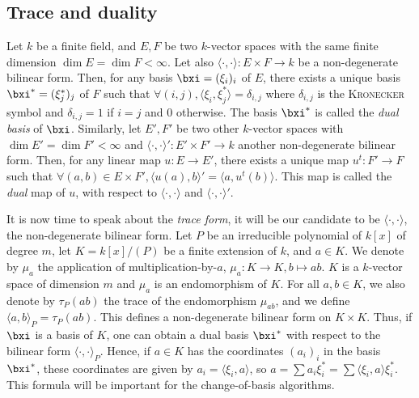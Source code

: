 \documentclass[a4paper,11pt]{article}
\theoremstyle{break}
\theoremstyle{definition}
\theoremstyle{remark}
\newcommand{\ps}[2]{\langle#1,#2\rangle}
\begin{document}
\subsection{Trace and duality}
Let $k$ be a finite field, and  $E,F$ be two $k$-vector spaces with the same
finite dimension $\dim E = \dim F < \infty$. Let also
$\ps{\cdot}{\cdot}:E\times F\rightarrow k$ be a non-degenerate bilinear form. 
Then,
for any basis $\bxi=(\xi_i)_i$ of $E$, there exists a unique basis
$\bxi^*=(\xi_j^*)_j$ of $F$
such that $\forall (i,j),\ps{\xi_i}{\xi_j^*}=\delta_{i,j}$ where $\delta_{i,j}$ 
is
the \textsc{Kronecker} symbol and $\delta_{i,j}=1$ if $i=j$ and 0 otherwise.
The basis $\bxi^*$ is called the \emph{dual basis} of $\bxi$.
Similarly, let $E',F'$ be two other $k$-vector spaces with $\dim E' = \dim F' <
\infty$ and $\ps{\cdot}{\cdot}':E'\times F'\rightarrow k$ another 
non-degenerate
bilinear form. Then, for any linear map $u:E\rightarrow E'$, there exists a
unique map $u^t:F'\rightarrow F$ such that $\forall (a,b)\in E\times
F',\ps{u(a)}{b}'=\ps{a}{u^t(b)}$. This map is called the \emph{dual} map of $u$,
with respect to $\ps{\cdot}{\cdot}$ and $\ps{\cdot}{\cdot}'$.

It is now time to speak about the \emph{trace form}, it will be our candidate to 
be 
$\ps{\cdot}{\cdot}$, the non-degenerate bilinear form. Let $P$ be an irreducible
polynomial of $k[x]$ of degree $m$, let $K=k[x]/(P)$ be a finite
extension of $k$, and $a\in K$. We denote by $\mu_a$ the application of
multiplication-by-$a$, $\mu_a:K\rightarrow K, b\mapsto ab$. $K$ is a $k$-vector
space of dimension $m$ and $\mu_a$ is an endomorphism of $K$. For all 
$a,b\in K$, we also denote by $\tau_P(ab)$ the trace of the endomorphism 
$\mu_{ab}$, and we define
$\ps{a}{b}_P=\tau_P(ab)$. This defines a non-degenerate bilinear form on 
$K\times
K$. Thus, if $\bxi$ is a basis of $K$, one can obtain a dual basis $\bxi^*$ with
respect to the bilinear form $\ps{\cdot}{\cdot}_P$. Hence, if $a\in K$ has the
coordinates $(a_i)_i$ in the basis $\bxi^*$, these coordinates are given by
$a_i=\ps{\xi_i}{a}$, so $a=\sum a_i\xi_i^*=\sum\ps{\xi_i}{a}\xi_i^*$. This
formula will be important for the change-of-basis algorithms.
\end{document}
